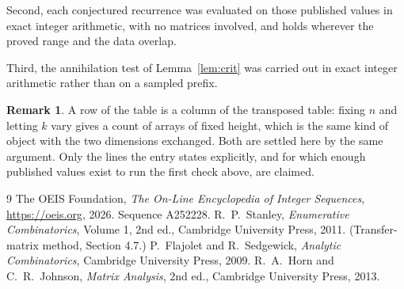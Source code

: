 \documentclass[11pt,a4paper]{article}
\theoremstyle{plain}
\theoremstyle{definition}
\newtheorem{remark}[theorem]{Remark}
\begin{document}
Second, each conjectured recurrence was evaluated on those published values in exact
integer arithmetic, with no matrices involved, and holds wherever the proved range and the
data overlap.

Third, the annihilation test of Lemma~\ref{lem:crit} was carried out in exact integer
arithmetic rather than on a sampled prefix.

\begin{remark}
A row of the table is a column of the transposed table: fixing $n$ and letting $k$ vary gives a
count of arrays of fixed height, which is the same kind of object with the two dimensions
exchanged. Both are settled here by the same argument. Only the lines the entry states
explicitly, and for which enough published values exist to run the first check above, are
claimed.
\end{remark}

\begin{thebibliography}{9}
 The OEIS Foundation, \emph{The On-Line Encyclopedia of Integer
Sequences}, \url{https://oeis.org}, 2026. Sequence A252228.
 R.~P.~Stanley, \emph{Enumerative Combinatorics}, Volume 1, 2nd ed.,
Cambridge University Press, 2011. (Transfer-matrix method, Section 4.7.)
 P.~Flajolet and R.~Sedgewick, \emph{Analytic Combinatorics}, Cambridge
University Press, 2009.
 R.~A.~Horn and C.~R.~Johnson, \emph{Matrix Analysis}, 2nd ed., Cambridge
University Press, 2013.
\end{thebibliography}
\end{document}
